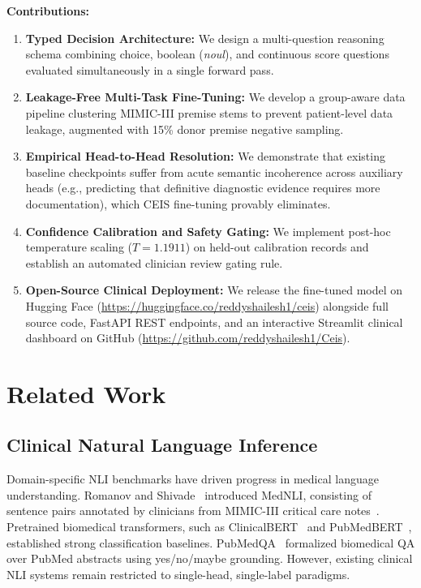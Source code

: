 \documentclass[10pt,conference]{IEEEtran}
\begin{document}
\textbf{Contributions:}
\begin{enumerate}
    \item \textbf{Typed Decision Architecture:} We design a multi-question reasoning schema combining choice, boolean (\textit{noul}), and continuous score questions evaluated simultaneously in a single forward pass.
    \item \textbf{Leakage-Free Multi-Task Fine-Tuning:} We develop a group-aware data pipeline clustering MIMIC-III premise stems to prevent patient-level data leakage, augmented with 15\% donor premise negative sampling.
    \item \textbf{Empirical Head-to-Head Resolution:} We demonstrate that existing baseline checkpoints suffer from acute semantic incoherence across auxiliary heads (e.g., predicting that definitive diagnostic evidence requires more documentation), which CEIS fine-tuning provably eliminates.
    \item \textbf{Confidence Calibration and Safety Gating:} We implement post-hoc temperature scaling ($T = 1.1911$) on held-out calibration records and establish an automated clinician review gating rule.
    \item \textbf{Open-Source Clinical Deployment:} We release the fine-tuned model on Hugging Face (\url{https://huggingface.co/reddyshailesh1/ceis}) alongside full source code, FastAPI REST endpoints, and an interactive Streamlit clinical dashboard on GitHub (\url{https://github.com/reddyshailesh1/Ceis}).
\end{enumerate}

\section{Related Work}
\subsection{Clinical Natural Language Inference}
Domain-specific NLI benchmarks have driven progress in medical language understanding. Romanov and Shivade~\cite{romanov2018lessons} introduced MedNLI, consisting of sentence pairs annotated by clinicians from MIMIC-III critical care notes~\cite{johnson2016mimic}. Pretrained biomedical transformers, such as ClinicalBERT~\cite{alsentzer2019publicly} and PubMedBERT~\cite{gu2021domain}, established strong classification baselines. PubMedQA~\cite{jin2019pubmedqa} formalized biomedical QA over PubMed abstracts using yes/no/maybe grounding. However, existing clinical NLI systems remain restricted to single-head, single-label paradigms.
\end{document}

